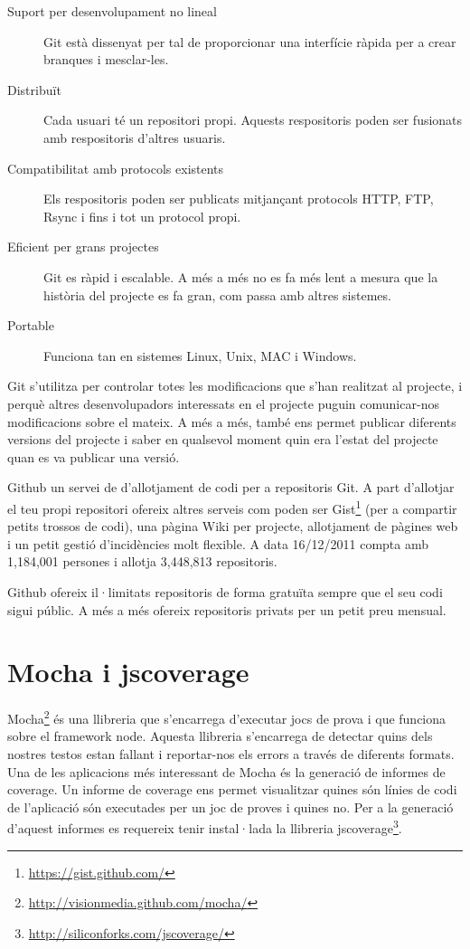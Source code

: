 \begin{description}
    \item[Suport per desenvolupament no lineal] Git està dissenyat per tal de proporcionar una interfície ràpida per a crear branques i mesclar-les.
    \item[Distribuït] Cada usuari té un repositori propi. Aquests respositoris poden ser fusionats amb respositoris d'altres usuaris.
    \item[Compatibilitat amb protocols existents] Els respositoris poden ser publicats mitjançant protocols HTTP, FTP, Rsync i fins i tot un protocol propi.
    \item[Eficient per grans projectes] Git es ràpid i escalable. A més a més no es fa més lent a mesura que la història del projecte es fa gran, com passa amb altres sistemes.
    \item[Portable] Funciona tan en sistemes Linux, Unix, MAC i Windows.
\end{description}

Git s'utilitza per controlar totes les modificacions que s'han realitzat al projecte, i perquè altres desenvolupadors interessats en el projecte puguin comunicar-nos modificacions sobre el mateix. A més a més, també ens permet publicar diferents versions del projecte i saber en qualsevol moment quin era l'estat del projecte quan es va publicar una versió. 

Github un servei de d'allotjament de codi per a repositoris Git. A part d'allotjar el teu propi repositori ofereix altres serveis com poden ser Gist\footnote{\url{https://gist.github.com/}} (per a compartir petits trossos de codi), una pàgina Wiki per projecte, allotjament de pàgines web i un petit gestió d'incidències molt flexible. A data 16/12/2011 compta amb 1,184,001 persones i allotja 3,448,813 repositoris.

Github ofereix il·limitats repositoris de forma gratuïta sempre que el seu codi sigui públic. A més a més ofereix repositoris privats per un petit preu mensual. 

\section{Mocha i jscoverage}

Mocha\footnote{\url{http://visionmedia.github.com/mocha/}} és una llibreria que s'encarrega d'executar jocs de prova i que funciona sobre el framework node. Aquesta llibreria s'encarrega de detectar quins dels nostres testos estan fallant i reportar-nos els errors a través de diferents formats. Una de les aplicacions més interessant de Mocha és la generació de informes de coverage. Un informe de coverage ens permet visualitzar quines són línies de codi de l'aplicació són executades per un joc de proves i quines no. Per a la generació d'aquest informes es requereix tenir instal·lada la llibreria jscoverage\footnote{\url{http://siliconforks.com/jscoverage/}}. 

